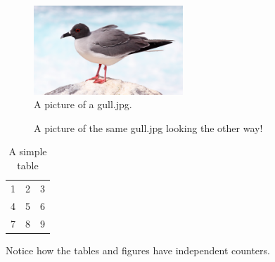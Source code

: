 \documentclass[a4paper,12pt]{article}
\begin{document}
\begin{figure}[!ht]
  \caption{A picture of a gull.jpg.}
  \centering
    \includegraphics[width=0.5\textwidth]{gull.jpg}
\end{figure}

\begin{figure}[!ht]
  \centering
  \caption{A picture of the same gull.jpg
           looking the other way!}
\end{figure}

\begin{table}[!ht]
  \begin{center}
    \begin{tabular}{| l c r |}
    \hline
    1 & 2 & 3 \\
    4 & 5 & 6 \\
    7 & 8 & 9 \\
    \hline
    \end{tabular}
  \end{center}
  \caption{A simple table}
\end{table}

Notice how the tables and figures
have independent counters.
\end{document}
